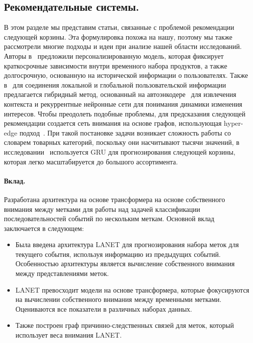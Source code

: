 \documentclass[a4paper, 12pt]{article} %
\begin{document}
\subsection{Рекомендательные системы.}
В этом разделе мы представим статьи, связанные с проблемой рекомендации следующей корзины. Эта формулировка похожа на нашу, поэтому мы также рассмотрели многие подходы и идеи при анализе нашей области исследований. Авторы в~\cite{ariannezhad2023personalized} предложили персонализированную модель, которая фиксирует краткосрочные зависимости внутри временного набора продуктов, а также долгосрочную, основанную на исторической информации о пользователях. Также в~\cite{yannam2023hybrid} для соединения локальной и глобальной пользовательской информации предлагается гибридный метод, основанный на автоэнкодере~\cite{liou2014autoencoder} для извлечения контекста и рекуррентные нейронные сети для понимания динамики изменения интересов. Чтобы преодолеть подобные проблемы, для предсказания следующей рекомендации создается сеть внимания на основе графов, использующая hyper-edge подход~\cite{song2023hgat}.
При такой постановке задачи возникает сложность работы со словарем товарных категорий, поскольку они насчитывают тысячи значений, в исследовании~\cite{van2023next} используется GRU для прогнозирования следующей корзины, которая легко масштабируется до большого ассортимента.


\paragraph{\textbf{Вклад.}}
Разработана архитектура на основе трансформера на основе собственного внимания между метками для работы над задачей классификации последовательностей событий по нескольким меткам. Основной вклад заключается в следующем:
\begin{itemize}
    \item Была введена архитектура LANET для прогнозирования набора меток для текущего события, используя информацию из предыдущих событий. Особенностью архитектуры является вычисление собственного внимания между представлениями меток.  
    \item LANET превосходит модели на основе трансформера, которые фокусируются на вычислении собственного внимания между временными метками. Оцениваются все показатели в различных наборах данных.
    \item Также построен граф причинно-следственных связей для меток, который использует веса внимания LANET.
\end{itemize}
\end{document}
